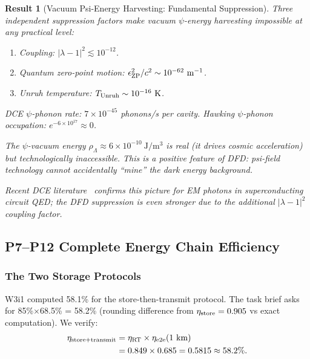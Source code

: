 \documentclass[aps,prd,twocolumn,superscriptaddress]{revtex4-2}
\newcommand{\lam}{|\lambda-1|}
\newtheorem{result}{Result}
\begin{document}
\begin{result}[Vacuum Psi-Energy Harvesting: Fundamental Suppression]
Three independent suppression factors make vacuum $\psi$-energy harvesting
impossible at any practical level:
\begin{enumerate}
\item Coupling: $\lam^2 \lesssim 10^{-12}$.
\item Quantum zero-point motion: $\epsilon_{\rm ZP}^2/c^2 \sim 10^{-62}~\mathrm{m^{-1}}$.
\item Unruh temperature: $T_{\rm Unruh} \sim 10^{-16}~\mathrm{K}$.
\end{enumerate}
DCE $\psi$-phonon rate: $7\times 10^{-45}$ phonons/s per cavity.
Hawking $\psi$-phonon occupation: $e^{-6\times 10^{17}} \approx 0$.

The $\psi$-vacuum energy $\rho_\Lambda \approx 6\times 10^{-10}~\mathrm{J/m^3}$
is real (it drives cosmic acceleration) but technologically inaccessible.
This is a positive feature of DFD: psi-field technology cannot accidentally
``mine'' the dark energy background.

Recent DCE literature~\cite{Dodonov2025} confirms this picture for EM
photons in superconducting circuit QED; the DFD suppression is even
stronger due to the additional $\lam^2$ coupling factor.
\end{result}

\subsection{P7--P12 Complete Energy Chain Efficiency}
\label{sec:chain}

\subsubsection{The Two Storage Protocols}

W3i1 computed 58.1\% for the store-then-transmit protocol.  The task
brief asks for 85\%$\times$68.5\% = 58.2\% (rounding difference from
$\eta_{\rm store} = 0.905$ vs exact computation).  We verify:
\begin{align}
\eta_{\rm store+transmit} &= \eta_{\rm RT}\times\eta_{\rm e2e}(1~\text{km}) \notag\\
&= 0.849\times 0.685 = 0.5815 \approx 58.2\%.
\end{align}
\end{document}
